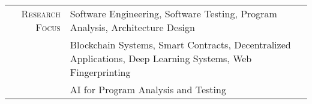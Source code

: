 \begin{tabular}{rl}
	  \textsc{Research Focus}  & Software Engineering, Software Testing, Program Analysis, Architecture Design \\
	  & Blockchain Systems, Smart Contracts, Decentralized Applications, Deep Learning Systems, Web Fingerprinting        \\
	  & AI for Program Analysis and Testing
\end{tabular}
\newline
\newline
